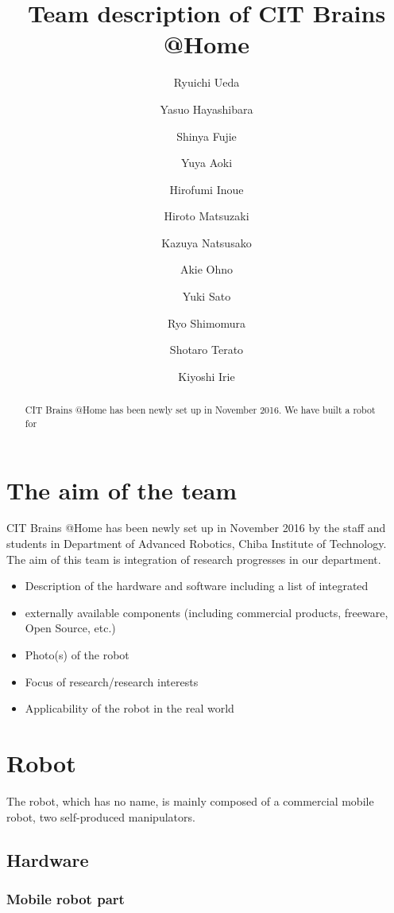 \documentclass{llncs}
\begin{document}
\title{Team description of CIT Brains @Home}

\author{Ryuichi Ueda \and
Yasuo Hayashibara \and
Shinya Fujie \and
Yuya Aoki \and
Hirofumi Inoue \and
Hiroto Matsuzaki \and
Kazuya Natsusako \and
Akie Ohno \and
Yuki Sato \and
Ryo Shimomura \and
Shotaro Terato \and
Kiyoshi Irie
}


\maketitle
%
\begin{abstract}
CIT Brains @Home has been newly set up in November 2016.
We have built a robot for 
\end{abstract}
%
\section{The aim of the team}

CIT Brains @Home has been newly set up in November 2016
by the staff and students in Department of Advanced Robotics,
Chiba Institute of Technology.
The aim of this team is integration of research progresses
in our department.

\begin{itemize}
	\item    Description of the hardware and software including a list of integrated 
	\item    externally available components (including commercial products, freeware, Open Source, etc.) 
	\item    Photo(s) of the robot 
	\item    Focus of research/research interests 
	\item    Applicability of the robot in the real world
\end{itemize}

\section{Robot}
The robot, which has no name, is mainly composed of a commercial mobile robot,
two self-produced manipulators.

\subsection{Hardware}
\subsubsection{Mobile robot part}
\end{document}
